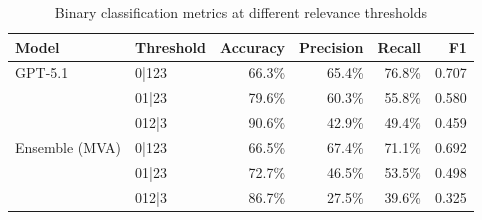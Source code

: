 \begin{table}[htbp]
\centering
\caption{Binary classification metrics at different relevance thresholds}
\label{tab:binarized-metrics}
\begin{tabular}{ll|rrrr}
\toprule
Model & Threshold & Accuracy & Precision & Recall & F1 \\
\midrule
GPT-5.1 & 0|123 & 66.3\% & 65.4\% & 76.8\% & 0.707 \\
 & 01|23 & 79.6\% & 60.3\% & 55.8\% & 0.580 \\
 & 012|3 & 90.6\% & 42.9\% & 49.4\% & 0.459 \\
\midrule
Ensemble (MVA) & 0|123 & 66.5\% & 67.4\% & 71.1\% & 0.692 \\
 & 01|23 & 72.7\% & 46.5\% & 53.5\% & 0.498 \\
 & 012|3 & 86.7\% & 27.5\% & 39.6\% & 0.325 \\
\bottomrule
\end{tabular}
\end{table}